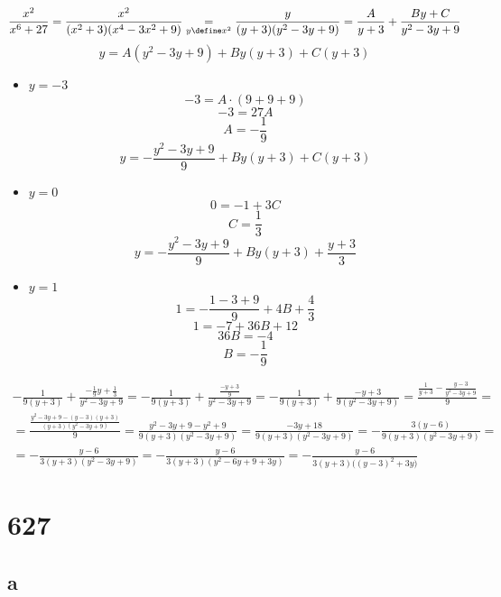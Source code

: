 $$ \frac{x^2}{x^6 + 27} = \frac{x^2}{(x^2 + 3)(x^4 - 3x^2 + 9)} \underset{y \define x^2}= \frac{y}{(y + 3)(y^2 - 3y + 9)} = \frac{A}{y + 3} + \frac{By + C}{y^2 - 3y + 9} $$
$$ y = A(y^2 - 3y + 9) + By(y + 3) + C(y + 3) $$
\begin{itemize}
	\item $ y = -3 $
    $$ -3 = A \cdot (9 + 9 + 9) $$
    $$ -3 = 27A $$
    $$ A = -\frac19 $$
    $$ y = -\frac{y^2 - 3y + 9}9 + By(y + 3) + C(y + 3) $$
    \item $ y = 0 $
    $$ 0 = -1 + 3C $$
    $$ C = \frac13 $$
    $$ y = -\frac{y^2 - 3y + 9}9 + By(y + 3) + \frac{y + 3}3 $$
    \item $ y = 1 $
    $$ 1 = -\frac{1 - 3 + 9}9 + 4B + \frac43 $$
    $$ 1 = -7 + 36B + 12 $$
    $$ 36B = -4 $$
    $$ B = -\frac19 $$
\end{itemize}
\begin{multline*}
    -\frac1{9(y + 3)} + \frac{-\frac19y + \frac13}{y^2 - 3y + 9} = -\frac1{9(y + 3)} + \frac{\frac{-y + 3}9}{y^2 - 3y + 9} = -\frac1{9(y + 3)} + \frac{-y + 3}{9(y^2 - 3y + 9)} = \frac{\frac1{y + 3} - \frac{y - 3}{y^2 - 3y + 9}}9 = \\
    = \frac{\frac{y^2 - 3y + 9 - (y - 3)(y + 3)}{(y + 3)(y^2 - 3y + 9)}}9 = \frac{y^2 - 3y + 9 - y^2 + 9}{9(y + 3)(y^2 - 3y + 9)} = \frac{-3y + 18}{9(y + 3)(y^2 - 3y + 9)} = -\frac{3(y - 6)}{9(y + 3)(y^2 - 3y + 9)} = \\
    = -\frac{y - 6}{3(y + 3)(y^2 - 3y + 9)} = -\frac{y - 6}{3(y + 3)(y^2 - 6y + 9 + 3y)} = -\frac{y - 6}{3(y + 3) \bigg( (y - 3)^2 + 3y \bigg) }
\end{multline*}

\section{627}

\subsection{a}

